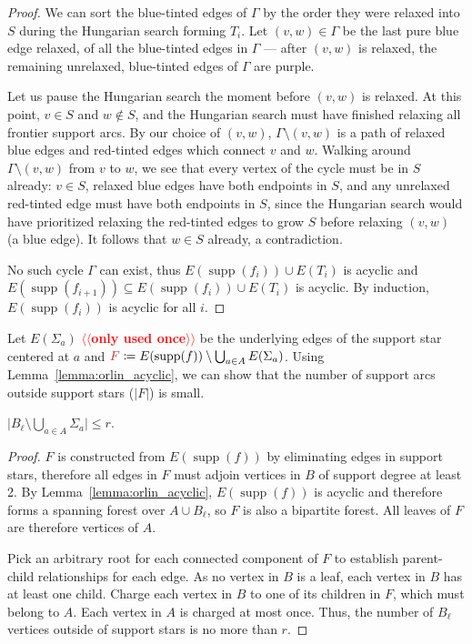 \documentclass[a4paper,UKenglish]{socg-lipics-v2018}
\makeatletter
\def\abs#1{\mathopen| #1 \mathclose|}		%
\def\supp{\operatorname{supp}}
\theoremstyle{plain}
\numberwithin{figure}{section}
\def\EMPH#1{\textcolor{BrickRed}{{\emph{#1}}}}
\def\n@te#1{\textsf{\boldmath \textbf{$\langle\!\langle$#1$\rangle\!\rangle$}}\leavevmode}
\def\note#1{\textcolor{red}{\n@te{#1}}}
\makeatother
\begin{document}
\begin{toappendix}
\begin{proof}
We can sort the blue-tinted edges of $\Gamma$ by the order they were relaxed
into $S$ during the Hungarian search forming $T_i$.
Let $(v, w) \in \Gamma$ be the last pure blue edge relaxed, of all the
blue-tinted edges in $\Gamma$ --- after $(v, w)$ is relaxed, the remaining
unrelaxed, blue-tinted edges of $\Gamma$ are purple.

Let us pause the Hungarian search the moment before $(v, w)$ is relaxed.
At this point, $v \in S$ and $w \not\in S$, and the Hungarian search must have
finished relaxing all frontier support arcs.
By our choice of $(v, w)$, $\Gamma \setminus (v, w)$ is a path of relaxed blue
edges and red-tinted edges which connect $v$ and $w$.
Walking around $\Gamma \setminus (v, w)$ from $v$ to $w$, we see that every
vertex of the cycle must be in $S$ already: $v \in S$, relaxed blue edges have
both endpoints in $S$, and any unrelaxed red-tinted edge must have both
endpoints in $S$, since the Hungarian search would have prioritized relaxing
the red-tinted edges to grow $S$ before relaxing $(v, w)$ (a blue edge).
It follows that $w \in S$ already, a contradiction.

No such cycle $\Gamma$ can exist, thus $E(\supp(f_i)) \cup E(T_i)$ is acyclic
and $E(\supp(f_{i+1})) \subseteq E(\supp(f_i)) \cup E(T_i)$ is acyclic.
By induction, $E(\supp(f_i))$ is acyclic for all $i$.
\end{proof}

Let \EMPH{$E(\Sigma_a)$} \note{only used once} be the underlying edges of the support star centered
at $a$ and $\EMPH{$F$} \coloneqq E(\supp(f)) \setminus \bigcup_{a \in A} E(\Sigma_a)$.
Using Lemma~\ref{lemma:orlin_acyclic}, we can show that the number of support
arcs outside support stars ($\abs{F}$) is small.

\begin{lemmarep}
\label{lemma:no_star_support_size}
$\abs{B_\ell \setminus \bigcup_{a \in A} \Sigma_a} \leq r$.
\end{lemmarep}

\begin{proof}
$F$ is constructed from $E(\supp(f))$ by eliminating edges in support stars,
therefore all edges in $F$ must adjoin vertices in $B$ of support degree at
least 2.
By Lemma~\ref{lemma:orlin_acyclic}, $E(\supp(f))$ is acyclic and therefore forms
a spanning forest over $A \cup B_\ell$, so $F$ is also a bipartite forest.
All leaves of $F$ are therefore vertices of $A$.

Pick an arbitrary root for each connected component of $F$ to establish
parent-child relationships for each edge.
As no vertex in $B$ is a leaf, each vertex in $B$ has at least one child.
Charge each vertex in $B$ to one of its children in $F$, which must belong to $A$.
Each vertex in $A$ is charged at most once.
Thus, the number of $B_\ell$ vertices outside of support stars is no more than $r$.
\end{proof}

\end{toappendix}
\end{document}
